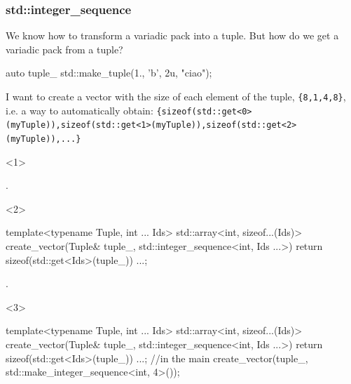 \documentclass[aspectratio=43]{beamer}
\begin{document}
\begin{frame}[fragile]\frametitle{std::integer\_sequence}
  We know how to transform a variadic pack into a tuple. But how do we get a variadic pack \alert{from} a tuple?

\begin{Cpplisting}{}
auto tuple_ std::make_tuple(1., 'b', 2u, "ciao");
\end{Cpplisting}
I want to create a vector with the size of each element of the tuple, \verb~{8,1,4,8}~,
i.e. a way to automatically obtain:
{\tiny\verb~{sizeof(std::get<0>(myTuple)),sizeof(std::get<1>(myTuple)),sizeof(std::get<2>(myTuple)),...}~}

\begin{onlyenv}<1>
\begin{Cpplisting}{}







.
\end{Cpplisting}
\end{onlyenv}

\begin{onlyenv}<2>
\begin{Cpplisting}{}
template<typename Tuple, int ... Ids>
std::array<int, sizeof...(Ids)>
create_vector(Tuple& tuple_,
              std::integer_sequence<int, Ids ...>){
  return {sizeof(std::get<Ids>(tuple_)) ...};
}

.
\end{Cpplisting}
\end{onlyenv}

\begin{onlyenv}<3>
\begin{Cpplisting}{}
template<typename Tuple, int ... Ids>
std::array<int, sizeof...(Ids)>
create_vector(Tuple& tuple_,
              std::integer_sequence<int, Ids ...>){
  return {sizeof(std::get<Ids>(tuple_)) ...};
}
//in the main
create_vector(tuple_, std::make_integer_sequence<int, 4>());
\end{Cpplisting}
\end{onlyenv}
\end{frame}

\end{document}
